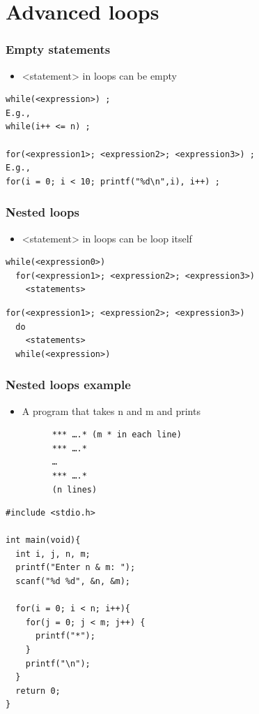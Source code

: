 \documentclass{../c-lecture}
\begin{document}
\section{Advanced loops}

\begin{frame}[fragile]
  \frametitle{Empty statements}
  \begin{itemize}
    \item <statement> in loops can be empty
  \end{itemize}
  \begin{verbatim}
while(<expression>) ;
E.g.,
while(i++ <= n) ;

for(<expression1>; <expression2>; <expression3>) ;
E.g.,
for(i = 0; i < 10; printf("%d\n",i), i++) ;
  \end{verbatim}
\end{frame}

\begin{frame}[fragile]
  \frametitle{Nested loops}
  \begin{itemize}
    \item <statement> in loops can be loop itself
  \end{itemize}
  \begin{verbatim}
while(<expression0>)
  for(<expression1>; <expression2>; <expression3>)
    <statements>
  \end{verbatim}
  \begin{verbatim}
for(<expression1>; <expression2>; <expression3>)
  do
    <statements>
  while(<expression>)
  \end{verbatim}
\end{frame}

\begin{frame}[fragile]
  \frametitle{Nested loops example}
  \begin{itemize}
    \item A program that takes n and m and prints
    \begin{verbatim}
      *** ….* (m * in each line)
      *** ….*
      …
      *** ….*
      (n lines)
    \end{verbatim}
  \end{itemize}
\end{frame}

\begin{frame}[fragile]
  \begin{verbatim}
#include <stdio.h>

int main(void){
  int i, j, n, m;
  printf("Enter n & m: ");
  scanf("%d %d", &n, &m);

  for(i = 0; i < n; i++){
    for(j = 0; j < m; j++) {
      printf("*");
    }
    printf("\n");
  }
  return 0;
}
  \end{verbatim}
\end{frame}
\end{document}
